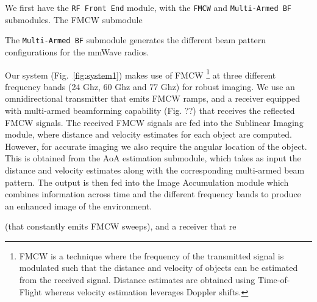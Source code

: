We first have the \texttt{RF Front End} module, with the \texttt{FMCW} and \texttt{Multi-Armed BF} submodules. The FMCW submodule 



The \texttt{Multi-Armed BF} submodule generates the different beam pattern configurations for the mmWave radios.

Our system (Fig.~\ref{fig:system1}) makes use of FMCW \footnote{FMCW is a technique where the frequency of the transmitted signal is modulated such that the distance and velocity of objects can be estimated from the received signal. Distance estimates are obtained using Time-of-Flight whereas velocity estimation leverages Doppler shifts.} at three different frequency bands (24 Ghz, 60 Ghz and 77 Ghz) for robust imaging. 
We use an omnidirectional transmitter that emits FMCW ramps, and a receiver equipped with  multi-armed beamforming capability (Fig. ??) that receives the reflected FMCW signals. The received FMCW signals are fed into the Sublinear Imaging module, where distance and velocity estimates for each object are computed. However, for accurate imaging we also require the angular location of the object. This is obtained from the AoA estimation submodule, which takes as input the distance and velocity estimates along with the corresponding multi-armed beam pattern.
The output is then fed into the Image Accumulation module which combines information across time and the different frequency bands to produce an enhanced image of the environment.

\fi




\iffalse




We use FMCW 
\footnote{FMCW is a technique where the frequency of the transmitted signal is modulated such that the distance and velocity of objects can be estimated from the received signal. Distance estimates are obtained using Time-of-Flight whereas velocity estimation leverages Doppler shifts.} 
at three different frequency bands (24 Ghz, 60 Ghz and 77 Ghz). 



 to image different objects in the environment by obtaining the distance and direction estimates for each object. 
 \fi
 

\iffalse

(that constantly emits FMCW sweeps), and a receiver that re




